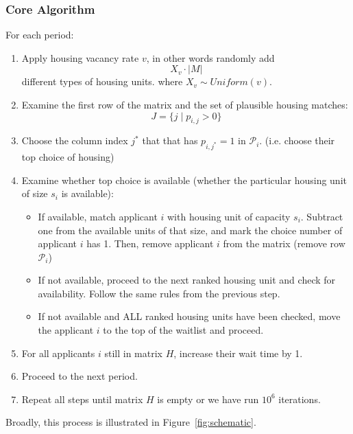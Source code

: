 \documentclass[11pt]{article}
\begin{document}
\subsubsection{Core Algorithm}
\newline
For each period:
\begin{enumerate}
    \item Apply housing vacancy rate $v$, in other words randomly add
    \[X_v \cdot |M|\]
    different types of housing units.
    where $X_v \sim Uniform(v)$.
    \item Examine the first row of the matrix and the set of plausible housing matches:
    \[J = \{j \mid p_{i,j} > 0\}\]
    \item Choose the column index $j^*$ that that has $p_{i,j^*} = 1$ in $\mathcal{P}_i$. (i.e. choose their top choice of housing)
    \item Examine whether top choice is available (whether the particular housing unit of size $s_i$ is available):
        \begin{itemize}
        \item If available, match applicant $i$ with housing unit of capacity $s_i$. Subtract one from the available units of that size, and mark the choice number of applicant $i$ has 1. Then, remove applicant $i$ from the matrix (remove row $\mathcal{P}_i$)
        \item If not available, proceed to the next ranked housing unit and check for availability. Follow the same rules from the previous step.
        \item If not available and ALL ranked housing units have been checked, move the applicant $i$ to the top of the waitlist and proceed. 
    \end{itemize}
    \item For all applicants $i$ still in matrix $H$, increase their wait time by 1. 
    \item Proceed to the next period. 
    \item Repeat all steps until matrix $H$ is empty or we have run $10^6$ iterations.
\end{enumerate}
Broadly, this process is illustrated in Figure~\ref{fig:schematic}.
\end{document}
